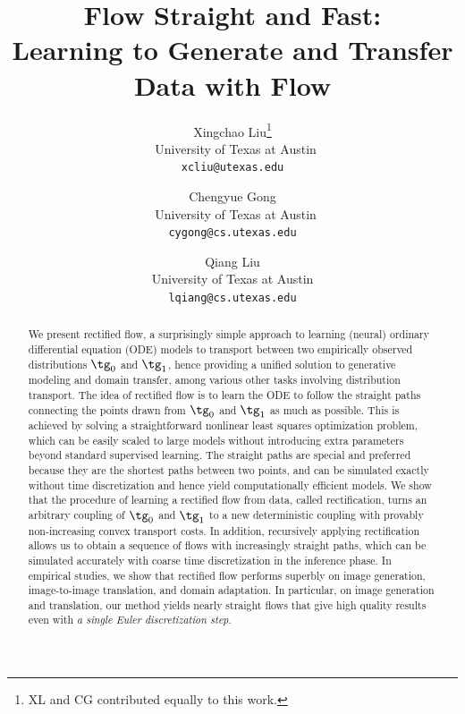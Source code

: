 \documentclass[11pt]{article}
\title{
Flow Straight and Fast: \\ 
 Learning to Generate and Transfer Data with 
 {\Name} Flow 
}
\author{%
	Xingchao Liu\thanks{XL and CG contributed equally to this work.}\\
    ~University of Texas at Austin\\
	\texttt{xcliu@utexas.edu}
	\and
	Chengyue Gong\printfnsymbol{1}\\
	~University of Texas at Austin\\
	\texttt{cygong@cs.utexas.edu} \\
	\and 
	Qiang Liu\\
	University of Texas at Austin\\
	\texttt{lqiang@cs.utexas.edu} \\
}
\date{}
\newcommand{\todo}[1]{\textcolor{gray}{TODO: #1}}
\newcommand{\qq}[1]{\textcolor{red}{\tiny \text{#1}}}
\begin{document}
\newcommand{\PyComment}[1]{\ttfamily\textcolor{commentcolor}{\# #1}}  %
\newcommand{\PyInput}[1]{\ttfamily\textcolor{inputcolor}{\# #1}}
\newcommand{\PyCode}[1]{\ttfamily\textcolor{black}{#1}} %

\maketitle
 
\begin{abstract}
We present rectified flow, 
a  surprisingly simple approach 
to learning (neural) ordinary differential equation (ODE) models to transport between two empirically observed distributions $\tg_0$ and $\tg_1$,
hence providing a unified solution to 
generative modeling and domain transfer, among various other tasks involving distribution transport. 
The idea of rectified flow is to learn the ODE to follow the straight paths connecting 
the points drawn from $\tg_0$ and $\tg_1$ as much as possible. 
This is  achieved by solving a straightforward nonlinear least squares optimization problem, 
which can be easily scaled to large models 
without introducing extra parameters beyond standard supervised learning. 
The straight paths  
are special and preferred because they are the shortest  
paths between two points, and can be simulated exactly without time discretization and hence yield computationally efficient models.  
We show that the procedure of learning a rectified flow from data, called rectification, turns an arbitrary coupling of $\tg_0$ and $\tg_1$ to a  new deterministic coupling with provably non-increasing convex transport costs. 
In addition, recursively applying 
rectification allows us to obtain a sequence of flows with increasingly straight paths, which can be simulated accurately with coarse time discretization in the inference phase. %
In empirical %
studies, 
we show that
rectified flow performs superbly on 
image generation, 
image-to-image translation, and domain adaptation. 
In particular, on image generation and translation, our method yields 
nearly straight flows 
that give high quality results even with \emph{a single Euler discretization step}. 
\end{abstract}
\end{document}
